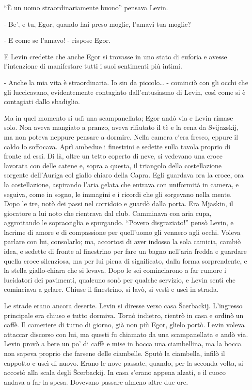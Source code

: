 ``È un uomo straordinariamente buono'' pensava Levin. 

- Be', e tu, Egor, quando hai preso moglie, l'amavi tua moglie? 

- E come se l'amavo! - rispose Egor. 

E Levin credette che anche Egor si trovasse in uno stato di euforia e avesse l'intenzione di manifestare tutti i suoi sentimenti più intimi. 

- Anche la mia vita è straordinaria. Io sin da piccolo\ldots{} - cominciò con gli occhi che gli luccicavano, evidentemente contagiato dall'entusiasmo di Levin, così come si è contagiati dallo sbadiglio. 

Ma in quel momento si udì una scampanellata; Egor andò via e Levin rimase solo. Non aveva mangiato a pranzo, aveva rifiutato il tè e la cena da Svijazskij, ma non poteva neppure pensare a dormire. Nella camera c'era fresco, eppure il caldo lo soffocava. Aprì ambedue i finestrini e sedette sulla tavola proprio di fronte ad essi. Di là, oltre un tetto coperto di neve, si vedevano una croce lavorata con delle catene e, sopra a questa, il triangolo della costellazione sorgente dell'Auriga col giallo chiaro della Capra. Egli guardava ora la croce, ora la costellazione, aspirando l'aria gelata che entrava con uniformità in camera, e seguiva, come in sogno, le immagini e i ricordi che gli sorgevano nella mente. Dopo le tre, notò dei passi nel corridoio e guardò dalla porta. Era Mjaskin, il giocatore a lui noto che rientrava dal club. Camminava con aria cupa, aggrottando le sopracciglia e spurgando. ``Povero disgraziato!'' pensò Levin, e lacrime di amore e di compassione per quell'uomo gli vennero agli occhi. Voleva parlare con lui, consolarlo; ma, accortosi di aver indosso la sola camicia, cambiò idea, e sedette di fronte al finestrino per fare un bagno nell'aria fredda e guardare quella croce silenziosa, ma per lui piena di significato, dalla forma sorprendente, e la stella giallo-chiara che si levava. Dopo le sei cominciarono a far rumore i lucidatori dei pavimenti, qualcuno sonò per qualche servizio, e Levin sentì che cominciava a gelare. Chiuse il finestrino, si lavò, si vestì e uscì in strada. 

\label{xv-3} 

Le strade erano ancora deserte. Levin si diresse verso casa Šcerbackij. L'ingresso principale era chiuso e tutto dormiva. Tornò indietro, rientrò in casa e ordinò un caffè. Il cameriere di turno di giorno, già non più Egor, glielo portò. Levin voleva attaccar discorso con lui, ma questi fu chiamato da una scampanellata e andò via. Levin provò a bere un po' di caffè e mise in bocca una ciambellina, ma la bocca non sapeva proprio che farsene delle ciambelle. Sputò la ciambella, infilò il cappotto e uscì di nuovo. Erano le nove passate, quando, per la seconda volta, si accostò alla scala degli Šcerbackij. In casa s'erano appena alzati, e il cuoco andava a far la spesa. Dovevano passare almeno altre due ore. 

